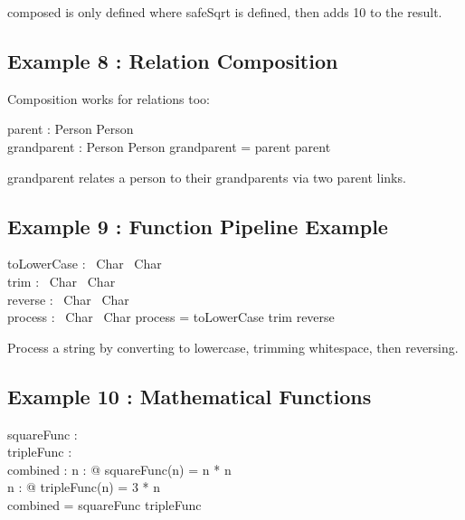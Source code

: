\documentclass[a4paper,10pt,fleqn]{article}
\begin{document}
\noindent composed is only defined where safeSqrt is defined, then adds 10 to the result.

\bigskip

\subsection*{Example 8 : Relation Composition}

\noindent Composition works for relations too:

\bigskip

\begin{axdef}
parent : Person \rel Person \\
grandparent : Person \rel Person
\where
grandparent = parent \comp parent
\end{axdef}

\noindent grandparent relates a person to their grandparents via two parent links.

\bigskip

\subsection*{Example 9 : Function Pipeline Example}

\begin{axdef}
toLowerCase : \seq~Char \fun \seq~Char \\
trim : \seq~Char \fun \seq~Char \\
reverse : \seq~Char \fun \seq~Char \\
process : \seq~Char \fun \seq~Char
\where
process = toLowerCase \comp trim \comp reverse
\end{axdef}

\noindent Process a string by converting to lowercase, trimming whitespace, then reversing.

\bigskip

\subsection*{Example 10 : Mathematical Functions}

\begin{axdef}
squareFunc : \nat \fun \nat \\
tripleFunc : \nat \fun \nat \\
combined : \nat \fun \nat
\where
\forall n : \nat @ squareFunc(n) = n * n \\
\forall n : \nat @ tripleFunc(n) = 3 * n \\
combined = squareFunc \comp tripleFunc
\end{axdef}
\end{document}
